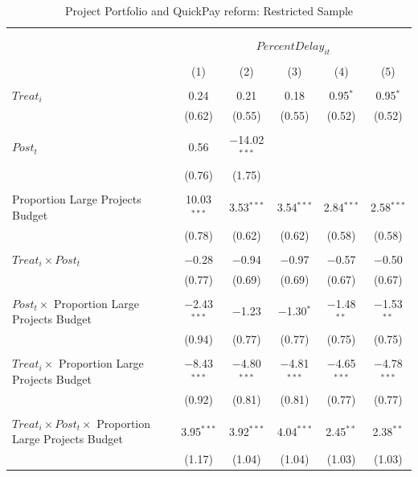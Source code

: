 \documentclass[
]{article}
\begin{document}
\begin{table}[H] \centering 
  \caption{Project Portfolio and QuickPay reform: Restricted Sample} 
  \label{} 
\small 
\begin{tabular}{@{\extracolsep{-2pt}}lccccc} 
\\[-1.8ex]\hline 
\hline \\[-1.8ex] 
\\[-1.8ex] & \multicolumn{5}{c}{$PercentDelay_{it}$  } \\ 
\\[-1.8ex] & (1) & (2) & (3) & (4) & (5)\\ 
\hline \\[-1.8ex] 
 $Treat_i$ & 0.24 & 0.21 & 0.18 & 0.95$^{*}$ & 0.95$^{*}$ \\ 
  & (0.62) & (0.55) & (0.55) & (0.52) & (0.52) \\ 
  & & & & & \\ 
 $Post_t$ & 0.56 & $-$14.02$^{***}$ &  &  &  \\ 
  & (0.76) & (1.75) &  &  &  \\ 
  & & & & & \\ 
 Proportion Large Projects Budget & 10.03$^{***}$ & 3.53$^{***}$ & 3.54$^{***}$ & 2.84$^{***}$ & 2.58$^{***}$ \\ 
  & (0.78) & (0.62) & (0.62) & (0.58) & (0.58) \\ 
  & & & & & \\ 
 $Treat_i \times Post_t$ & $-$0.28 & $-$0.94 & $-$0.97 & $-$0.57 & $-$0.50 \\ 
  & (0.77) & (0.69) & (0.69) & (0.67) & (0.67) \\ 
  & & & & & \\ 
 $Post_t \times$ Proportion Large Projects Budget & $-$2.43$^{***}$ & $-$1.23 & $-$1.30$^{*}$ & $-$1.48$^{**}$ & $-$1.53$^{**}$ \\ 
  & (0.94) & (0.77) & (0.77) & (0.75) & (0.75) \\ 
  & & & & & \\ 
 $Treat_i \times$ Proportion Large Projects Budget & $-$8.43$^{***}$ & $-$4.80$^{***}$ & $-$4.81$^{***}$ & $-$4.65$^{***}$ & $-$4.78$^{***}$ \\ 
  & (0.92) & (0.81) & (0.81) & (0.77) & (0.77) \\ 
  & & & & & \\ 
 $Treat_i \times Post_t \times$ Proportion Large Projects Budget & 3.95$^{***}$ & 3.92$^{***}$ & 4.04$^{***}$ & 2.45$^{**}$ & 2.38$^{**}$ \\ 
  & (1.17) & (1.04) & (1.04) & (1.03) & (1.03) \\ 

\end{tabular}
\end{table}
\end{document}
